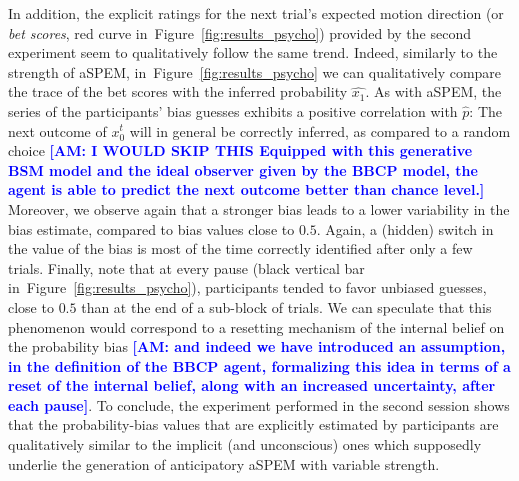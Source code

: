 \documentclass[12pt,english]{article}%
\newcommand{\seeFig}[1]{Figure~\ref{fig:#1}}
\newcommand{\AM}[1]{\textbf{\textcolor{blue}{[AM: #1]}}}
\begin{document}
In addition, the explicit ratings
for the next trial's expected motion direction (or \textit{bet scores}, red curve in~\seeFig{results_psycho})
provided by the second experiment
seem to qualitatively follow the same trend.
Indeed, similarly to the strength of aSPEM, in~\seeFig{results_psycho} we can qualitatively compare
the trace of the bet scores 
with the inferred probability $\hat{x_1}$.
As with aSPEM, the series of the participants' bias guesses 
exhibits a positive correlation with $\hat{p}$:
The next outcome of $x_{0}^{t}$ will in general be correctly inferred,
as compared to a random choice 
\AM{I WOULD SKIP THIS Equipped with this generative BSM model and the ideal observer given by the BBCP model,
the agent is able to predict the next outcome better than chance level.} 
Moreover, we observe again that a stronger bias leads to a lower variability in the bias estimate, compared to bias values close to $0.5$.
Again, a (hidden) switch in the value of the bias is
most of the time correctly identified after only a few trials.
Finally, note that at every pause (black vertical bar in~\seeFig{results_psycho}),
participants tended to favor unbiased guesses, close to $0.5$
than at the end of a sub-block of trials.
We can speculate that this phenomenon would correspond 
to a resetting mechanism of the internal belief on the probability bias \AM{and indeed we have introduced an assumption, in the definition of the BBCP agent, formalizing this idea in terms of a reset of the internal belief, along with an increased uncertainty, after each pause}.
To conclude, the experiment performed in the second session
shows that the probability-bias values that are explicitly estimated by participants
are qualitatively similar to the implicit (and unconscious) ones 
which supposedly underlie the generation of anticipatory aSPEM with variable strength.
\end{document}

